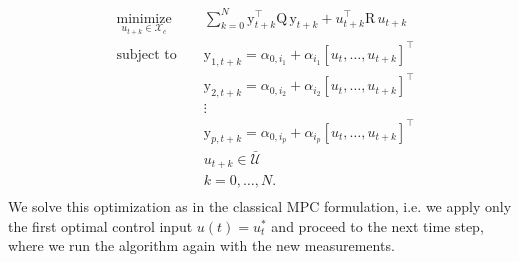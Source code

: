 \begin{equation}\label{eq:DPCRT}
\begin{aligned}
& \underset{u_{t+k} \in \mathcal{X}_c}{\text{minimize}} & &  \sum_{k=0}^{N}{\mathrm{y}^\top_{t+k} \mathrm{Q}\, \mathrm{y}_{t+k} + u^\top_{t+k} \mathrm{R}\, u_{t+k}}  \\
& \text{subject to }                                    & &  \mathrm{y}_{1,t+k}  =  \alpha_{0,i_1} + \alpha_{i_1}[u_t,\ldots,u_{t+k}]^\top                            \\
&                                                       & &  \mathrm{y}_{2,t+k}  =  \alpha_{0,i_2} + \alpha_{i_2}[u_t,\ldots,u_{t+k}]^\top                            \\
&                                                       & &  \vdots                                                                                                   \\
&                                                       & &  \mathrm{y}_{p,t+k}  =  \alpha_{0,i_p} + \alpha_{i_p}[u_t,\ldots,u_{t+k}]^\top                            \\
&                                                       & &  u_{t+k}            \in \mathcal{\bar U}                                                                  \\
&                                                       & &  k                   =   0,\ldots,N.                                                                       \\
\end{aligned}
\end{equation}
We solve this optimization as in the classical MPC formulation, i.e. we apply only the first optimal control input $u(t) = u^*_t$ and proceed to the next time step, where we run the algorithm again with the new measurements.

